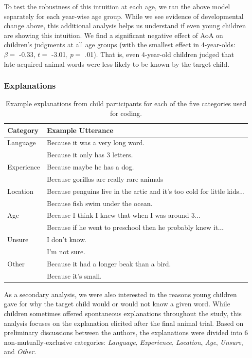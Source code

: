 \documentclass[10pt, letterpaper]{article}
\begin{document}
To test the robustness of this intuition at each age, we ran the above
model separately for each year-wise age group. While we see evidence of
developmental change above, this additional analysis helps us understand
if even young children are showing this intuition. We find a significant
negative effect of AoA on children's judgments at all age groups (with
the smallest effect in 4-year-olds: \(\beta =\) -0.33, \(t =\) -3.01,
\(p =\) .01). That is, even 4-year-old children judged that
late-acquired animal words were less likely to be known by the target
child.

\hypertarget{explanations}{%
\subsubsection{Explanations}\label{explanations}}

\begin{table}[tb]
\centering
\begin{tabular}{ll}
  \hline
Category & Example Utterance \\ 
  \hline
Language & Because it was a very long word. \\ 
    & Because it only has 3 letters. \\ 
  Experience & Because maybe he has a dog. \\ 
    & Because gorillas are really rare animals \\ 
  Location & Because penguins live in the artic and it's too cold for little kids... \\ 
    & Because fish swim under the ocean. \\ 
  Age & Because I think I knew that when I was around 3... \\ 
    & Because if he went to preschool then he probably knew it... \\ 
  Unsure & I don't know. \\ 
    & I'm not sure. \\ 
  Other & Because it had a longer beak than a bird. \\ 
    & Because it's small. \\ 
   \hline
\end{tabular}
\caption{Example explanations from child participants for each of the five categories used for coding.} 
\label{tab:explanations_table}
\end{table}

As a secondary analysis, we were also interested in the reasons young
children gave for why the target child would or would not know a given
word. While children sometimes offered spontaneous explanations
throughout the study, this analysis focuses on the explanation elicited
after the final animal trial. Based on preliminary discussions between
the authors, the explanations were divided into 6 non-mutually-exclusive
categories: \emph{Language}, \emph{Experience}, \emph{Location},
\emph{Age}, \emph{Unsure}, and \emph{Other}.
\end{document}
